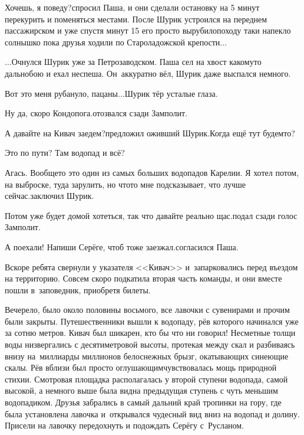 \diagdash Хочешь, я поведу?\mdash спросил Паша, и они сделали остановку на 5 минут перекурить и поменяться местами. После Шурик устроился на переднем пассажирском и уже спустя минут 15 его просто вырубило\mdash походу таки напекло солнышко пока друзья ходили по Староладожской крепости$\ldots$


$\ldots$Очнулся Шурик уже за Петрозаводском. Паша сел на хвост какому\sdash то дальнобою и ехал неспеша. Он~аккуратно вёл, Шурик даже выспался немного.

\diagdash Вот это меня рубануло, пацаны$\ldots$\mdash Шурик тёр усталые глаза.

\diagdash Ну да, скоро Кондопога.\mdash отозвался сзади Замполит.

\diagdash А давайте на Кивач заедем?\mdash предложил оживший Шурик.\mdash Когда ещё тут будем\sdash то?

\diagdash Это по пути? Там водопад и всё?

\diagdash Агась. Вообще\sdash то это один из самых больших водопадов Карелии. Я хотел потом, на выброске, туда зарулить, но что\sdash то мне подсказывает, что лучше сейчас.\mdash заключил Шурик.

\diagdash Потом уже будет домой хотеться, так что давайте реально щас.\mdash подал сзади голос Замполит.

\diagdash А поехали! Напиши Серёге, чтоб тоже заезжал.\mdash согласился Паша.

Вскоре ребята свернули у указателя <<Кивач>> и~запарковались перед въездом на территорию. Совсем скоро подкатила вторая часть команды, и они вместе пошли в~заповедник, приобретя билеты.

Вечерело, было около половины восьмого, все лавочки с сувенирами и прочим были закрыты. Путешественники вышли к водопаду, рёв которого начинался уже за сотню метров. Кивач был шикарен, кто бы что ни говорил! Несметные толщи воды низвергались с десятиметровой высоты, протекая между скал и разбиваясь внизу на~миллиарды миллионов белоснежных брызг, окатывающих синеющие скалы. Рёв вблизи был просто оглушающим\mdash чувствовалась мощь природной стихии. Смотровая площадка располагалась у второй ступени водопада, самой высокой, а немного выше была видна предыдущая ступень с чуть меньшим водопадиком. Друзья забрались в самый дальний край тропинки на гору, где была установлена лавочка и~открывался чудесный вид вниз на водопад и долину. Присели на лавочку передохнуть и подождать Серёгу с~Русланом. 

